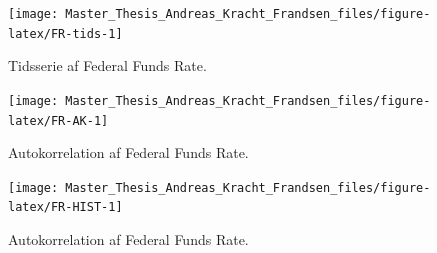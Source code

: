 \documentclass[
  a4paper,
  oneside]{memoir}
\begin{document}
\begin{figure}[htbp!]

{\centering \texttt{[image: Master\_Thesis\_Andreas\_Kracht\_Frandsen\_files/figure-latex/FR-tids-1]} 

}

\caption{Tidsserie af Federal Funds Rate.}\label{fig:FR-tids}
\end{figure}

\begin{figure}[htbp!]

{\centering \texttt{[image: Master\_Thesis\_Andreas\_Kracht\_Frandsen\_files/figure-latex/FR-AK-1]} 

}

\caption{Autokorrelation af Federal Funds Rate.}\label{fig:FR-AK}
\end{figure}

\begin{figure}[htbp!]

{\centering \texttt{[image: Master\_Thesis\_Andreas\_Kracht\_Frandsen\_files/figure-latex/FR-HIST-1]} 

}

\caption{Autokorrelation af Federal Funds Rate.}\label{fig:FR-HIST}
\end{figure}
\end{document}
